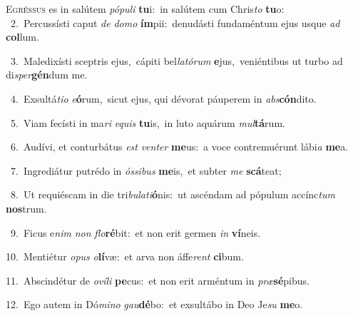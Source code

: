 \lettrine{\initial\textcolor{\initialcolor}{E}}{gréssus} es in salútem \textit{pó}\-\textit{pu}\textit{li} \textbf{tu}\-i:~\star in salútem cum Chris\textit{to} \textbf{tu}\-o:\\
{\numbfont\textcolor{\numbcolor}{~2.}}~Percussísti caput \textit{de} \textit{do}\-\textit{mo} \textbf{ím}\-pii:~\star denudásti fundaméntum ejus usque \textit{ad} \textbf{col}\-lum.\par
{\numbfont\textcolor{\numbcolor}{~3.}}~Maledixísti sceptris ejus,~\dagger cápiti bel\-\textit{la}\-\textit{tó}\textit{rum} \textbf{e}\-jus,~\star veniéntibus ut turbo ad di\-\textit{sper}\-\textbf{gén}dum me.\par
{\numbfont\textcolor{\numbcolor}{~4.}}~Exsultá\-\textit{ti}\-\textit{o} \textit{e}\-\textbf{ó}rum,~\star sicut ejus, qui dévorat páuperem in \textit{abs}\-\textbf{cón}dito.\par
{\numbfont\textcolor{\numbcolor}{~5.}}~Viam fecísti in ma\textit{ri} \textit{e}\-\textit{quis} \textbf{tu}\-is,~\star in luto aquárum \textit{mul}\-\textbf{tá}rum.\par
{\numbfont\textcolor{\numbcolor}{~6.}}~Audívi, et conturbátus \textit{est} \textit{ven}\-\textit{ter} \textbf{me}\-us:~\star a voce contremuérunt lábi\textit{a} \textbf{me}\-a.\par
{\numbfont\textcolor{\numbcolor}{~7.}}~Ingrediátur putrédo in \textit{ós}\-\textit{si}\textit{bus} \textbf{me}\-is,~\star et subter \textit{me} \textbf{scá}\-teat;\par
{\numbfont\textcolor{\numbcolor}{~8.}}~Ut requiéscam in die tri\-\textit{bu}\-\textit{la}\textit{ti}\textbf{ó}nis:~\star ut ascéndam ad pópulum accínc\textit{tum} \textbf{nos}\-trum.\par
{\numbfont\textcolor{\numbcolor}{~9.}}~Ficus e\textit{nim} \textit{non} \textit{flo}\-\textbf{ré}bit:~\star et non erit germen \textit{in} \textbf{ví}\-neis.\par
{\numbfont\textcolor{\numbcolor}{10.}}~Mentiétur \textit{o}\-\textit{pus} \textit{o}\-\textbf{lí}væ:~\star et arva non áffe\textit{rent} \textbf{ci}\-bum.\par
{\numbfont\textcolor{\numbcolor}{11.}}~Abscindétur de \textit{o}\-\textit{ví}\textit{li} \textbf{pe}\-cus:~\star et non erit arméntum in \textit{præ}\-\textbf{sé}pibus.\par
{\numbfont\textcolor{\numbcolor}{12.}}~Ego autem in Dó\-\textit{mi}\-\textit{no} \textit{gau}\-\textbf{dé}bo:~\star et exsultábo in Deo Je\textit{su} \textbf{me}\-o.\par
